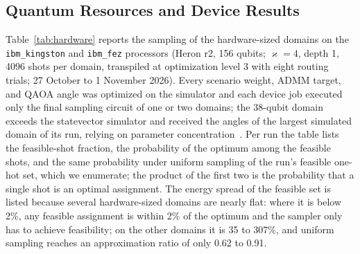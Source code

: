 \subsection{Quantum Resources and Device Results}
\label{sec:device}

Table~\ref{tab:hardware} reports the sampling of the hardware-sized domains on the \texttt{ibm\_kingston} and
\texttt{ibm\_fez} processors (Heron r2, 156 qubits; $\varkappa=4$, depth 1, 4096 shots per domain, transpiled at
optimization level 3 with eight routing trials; 27 October to 1 November 2026).
Every scenario weight, ADMM target, and QAOA angle was optimized on the simulator and each device job executed only
the final sampling circuit of one or two domains; the 38-qubit domain exceeds the statevector simulator and received
the angles of the largest simulated domain of its run, relying on parameter concentration~\cite{Brandao2018}. Per run
the table lists the feasible-shot fraction, the probability of the optimum among the feasible shots, and the same
probability under uniform sampling of the run's feasible one-hot set, which we enumerate; the product of the first
two is the probability that a single shot is an optimal assignment. The energy spread of the feasible set is listed because several hardware-sized domains are nearly flat: where it is below 2\%, any
feasible assignment is within 2\% of the optimum and the sampler only has to achieve feasibility; on the other domains
it is 35 to 307\%, and uniform sampling reaches an approximation ratio of only 0.62 to 0.91.



